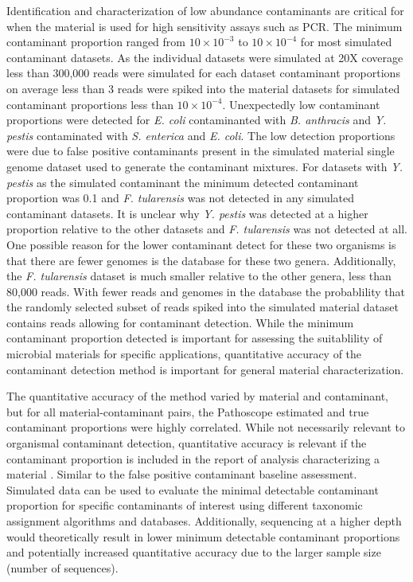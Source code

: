 \documentclass[fleqn,10pt,lineno]{wlpeerj}\usepackage[]{graphicx}\usepackage[]{color}
\begin{document}
Identification and characterization of low abundance contaminants are critical for when the material is used for high sensitivity assays such as PCR. 
The minimum contaminant proportion ranged from $10 \times 10^{-3}$ to $10 \times 10^{-4}$ for most simulated contaminant datasets. 
As the individual datasets were simulated at 20X coverage less than 300,000 reads were simulated for each dataset contaminant proportions on average less than 3 reads were spiked into the material datasets for simulated contaminant proportions less than $10 \times 10^{-4}$. 
Unexpectedly low contaminant proportions were detected for \textit{E. coli} contaminanted with \textit{B. anthracis} and \textit{Y. pestis} contaminated with \textit{S. enterica} and \textit{E. coli}. 
The low detection proportions were due to false positive contaminants present in the simulated material single genome dataset used to generate the contaminant mixtures. 
For datasets with \textit{Y. pestis} as the simulated contaminant the minimum detected contaminant proportion was 0.1 and \textit{F. tularensis} was not detected in any simulated contaminant datasets. 
It is unclear why \textit{Y. pestis} was detected at a higher proportion relative to the other datasets and \textit{F. tularensis} was not detected at all. 
One possible reason for the lower contaminant detect for these two organisms is that there are fewer genomes is the database for these two genera. 
Additionally, the \textit{F. tularensis} dataset is much smaller relative to the other genera, less than 80,000 reads. 
With fewer reads and genomes in the database the probablility that the randomly selected subset of reads spiked into the simulated material dataset contains reads allowing for contaminant detection. 
While the minimum contaminant proportion detected is important for assessing the suitablility of microbial materials for specific applications, quantitative accuracy of the contaminant detection method is important for general material characterization.


The quantitative accuracy of the method varied by material and contaminant, but for all material-contaminant pairs, the Pathoscope estimated and true contaminant proportions were highly correlated. 
While not necessarily relevant to organismal contaminant detection, quantitative accuracy is relevant if the contaminant proportion is included in the report of analysis characterizing a material \citep{olson2016pepr}.  
Similar to the false positive contaminant baseline assessment. 
Simulated data can be used to evaluate the minimal detectable contaminant proportion for specific contaminants of interest using different taxonomic assignment algorithms and databases. 
Additionally, sequencing at a higher depth would theoretically result in lower minimum detectable contaminant proportions and potentially increased quantitative accuracy due to the larger sample size (number of sequences).
\end{document}
